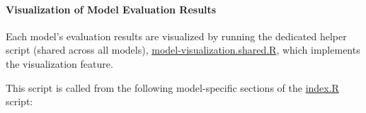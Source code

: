 \documentclass[
]{report}
\begin{document}
\paragraph{Visualization of Model Evaluation Results}\label{visualization-of-model-evaluation-results}

\hfill\break

Each model's evaluation results are visualized by running the dedicated helper script (shared across all models), \href{https://github.com/AzKurban-edX-DS/edx.capstone.choose-your-own/blob/main/r/models/model-visualization.shared.R}{model-visualization.shared.R}, which implements the visualization feature.

This script is called from the following model-specific sections of the \href{https://github.com/AzKurban-edX-DS/edx.capstone.choose-your-own/blob/main/r/index.R}{index.R} script:
\end{document}
